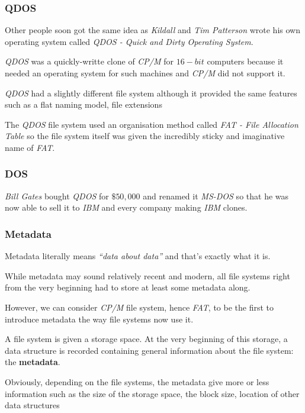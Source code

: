 \begin{frame}
  \frametitle{QDOS}

  Other people soon got the same idea as \textit{Kildall} and \textit{Tim
  Patterson} wrote his own operating system called \textit{QDOS - Quick
  and Dirty Operating System}.

  \-

  \textit{QDOS} was a quickly-writte clone of \textit{CP/M} for $16-bit$
  computers because it needed an operating system for such machines and
  \textit{CP/M} did not support it.

  \-

  \textit{QDOS} had a slightly different file system although it provided
  the same features such as a flat naming model, file extensions \etc{}

  \-

  The \textit{QDOS} file system used an organisation method called
  \textit{FAT - File Allocation Table} so the file system itself was given
  the incredibly sticky and imaginative name of \textit{FAT}.
\end{frame}


\begin{frame}
  \frametitle{DOS}

  \textit{Bill Gates} bought \textit{QDOS} for $\$50,000$ and renamed it
  \textit{MS-DOS} so that he was now able to sell it to \textit{IBM} and
  every company making \textit{IBM} clones.
\end{frame}


\begin{frame}
  \frametitle{Metadata}

  Metadata literally means \textit{``data about data''} and that's exactly
  what it is.

  \-

  While metadata may sound relatively recent and modern, all file systems
  right from the very beginning had to store at least some metadata along.

  \-

  However, we can consider \textit{CP/M} file system, hence \textit{FAT},
  to be the first to introduce metadata the way file systems now use it.

  \-

  A file system is given a storage space. At the very beginning of this
  storage, a data structure is recorded containing general information
  about the file system: the \textbf{metadata}.

  \-

  Obviously, depending on the file systems, the metadata give more or less
  information such as the size of the storage space, the block size,
  location of other data structures \etc{}
\end{frame}

